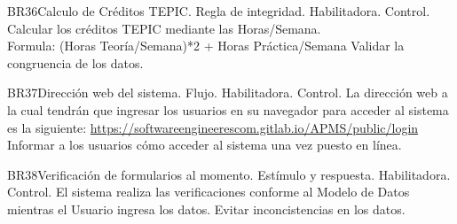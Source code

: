  \begin{BussinesRule}{BR36}{Calculo de Créditos TEPIC.}
     \BRitem[Tipo:] Regla de integridad.
     \BRitem[Clase:] Habilitadora.
     \BRitem[Nivel:] Control.
     \BRitem[Descripción:]Calcular los créditos TEPIC mediante las Horas/Semana.\\
     Formula: (Horas Teoría/Semana)*2 + Horas Práctica/Semana
     \BRitem[Motivación:] Validar la congruencia de los datos.
  \end{BussinesRule}
   \begin{BussinesRule}{BR37}{Dirección web del sistema.}
     \BRitem[Tipo:] Flujo.
     \BRitem[Clase:] Habilitadora.
     \BRitem[Nivel:] Control.
     \BRitem[Descripción:] La dirección web a la cual tendrán que ingresar los usuarios en su navegador para acceder al sistema es la siguiente: \url{https://softwareengineerescom.gitlab.io/APMS/public/login}
     \BRitem[Motivación:] Informar a los usuarios cómo acceder al sistema una vez puesto en línea.
  \end{BussinesRule}
   \begin{BussinesRule}{BR38}{Verificación de formularios al momento.}
     \BRitem[Tipo:]  Estímulo y respuesta.
     \BRitem[Clase:] Habilitadora.
     \BRitem[Nivel:] Control.
     \BRitem[Descripción:] El sistema realiza las verificaciones conforme al Modelo de Datos mientras el Usuario ingresa los datos.
     \BRitem[Motivación:] Evitar inconcistencias en los datos.
  \end{BussinesRule}
